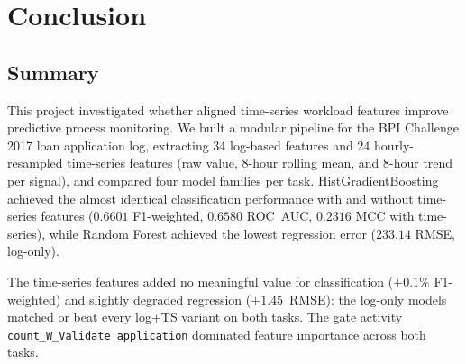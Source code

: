 \documentclass[runningheads]{llncs}
\begin{document}


\section{Conclusion}
\label{sec:conclusion}

\subsection{Summary}
\label{sec:summary}

This project investigated whether aligned time-series workload features improve
predictive process monitoring. We built a modular pipeline for the BPI
Challenge 2017 loan application log, extracting 34 log-based features and 24
hourly-resampled time-series features (raw value, 8-hour rolling mean, and
8-hour trend per signal), and compared four model families per task.
HistGradientBoosting achieved the almost identical classification performance with and without time-series features ($0.6601$
F1-weighted, $0.6580$ ROC~AUC, $0.2316$ MCC with time-series), while Random Forest achieved the
lowest regression error ($233.14$ RMSE, log-only).

The time-series features added no meaningful value for classification
($+0.1\%$ F1-weighted) and slightly degraded regression ($+1.45$~RMSE): the
log-only models matched or beat every log+TS variant on both tasks. The gate
activity \texttt{count\_W\_Validate application} dominated feature importance
across both tasks.
\end{document}
